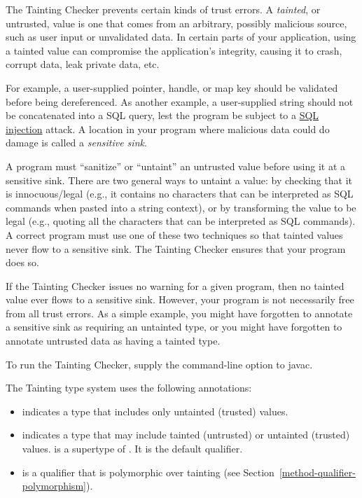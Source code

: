 \htmlhr
{}

The Tainting Checker prevents certain kinds of trust errors.
A \emph{tainted}, or untrusted, value is one that comes from an arbitrary,
possibly malicious source, such as user input or unvalidated data.
In certain parts of your application, using a tainted value can compromise
the application's integrity, causing it to crash, corrupt data, leak
private data, etc.


For example, a user-supplied pointer, handle, or map key should be
validated before being dereferenced.
As another example, a user-supplied string should not be concatenated into a
SQL query, lest the program be subject to a
\href{https://en.wikipedia.org/wiki/Sql_injection}{SQL injection} attack.
A location in your program where malicious data could do damage is
called a \emph{sensitive sink}.

A program must ``sanitize'' or ``untaint'' an untrusted value before using
it at a sensitive sink.  There are two general ways to untaint a value:
by checking
that it is innocuous/legal (e.g., it contains no characters that can be
interpreted as SQL commands when pasted into a string context), or by
transforming the value to be legal (e.g., quoting all the characters that
can be interpreted as SQL commands).  A correct program must use one of
these two techniques so that tainted values never flow to a sensitive sink.
The Tainting Checker ensures that your program does so.

If the Tainting Checker issues no warning for a given program, then no
tainted value ever flows to a sensitive sink.  However, your program is not
necessarily free from all trust errors.  As a simple example, you might
have forgotten to annotate a sensitive sink as requiring an untainted type,
or you might have forgotten to annotate untrusted data as having a tainted
type.

To run the Tainting Checker, supply the
command-line option to javac.




The Tainting type system uses the following annotations:
\begin{itemize}
\item
   indicates
  a type that includes only untainted (trusted) values.
\item
   indicates
  a type that may include tainted (untrusted) or untainted (trusted) values.
   is a supertype of .
  It is the default qualifier.
\item
   is a qualifier that is
  polymorphic over tainting (see Section~\ref{method-qualifier-polymorphism}).
\end{itemize}


